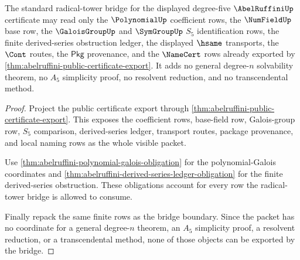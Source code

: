\begin{theorem}
\label{thm:abelruffini-standard-radical-tower-bridge-boundary}
The standard radical-tower bridge for the displayed degree-five
$\AbelRuffiniUp$ certificate may read only the $\PolynomialUp$ coefficient
rows, the $\NumFieldUp$ base row, the $\GaloisGroupUp$ and $\SymGroupUp$ $S_5$
identification rows, the finite derived-series obstruction ledger, the
displayed $\hsame$ transports, the $\Cont$ routes, the $\mathsf{Pkg}$
provenance, and the $\NameCert$ rows already exported by
\autoref{thm:abelruffini-public-certificate-export}. It adds no general
degree-$n$ solvability theorem, no $A_5$ simplicity proof, no resolvent
reduction, and no transcendental method.
\end{theorem}
\begin{proof}
Project the public certificate export through
\autoref{thm:abelruffini-public-certificate-export}. This exposes the
coefficient rows, base-field row, Galois-group row, $S_5$ comparison,
derived-series ledger, transport routes, package provenance, and local naming
rows as the whole visible packet.

Use \autoref{thm:abelruffini-polynomial-galois-obligation} for the
polynomial-Galois coordinates and
\autoref{thm:abelruffini-derived-series-ledger-obligation} for the finite
derived-series obstruction. These obligations account for every row the
radical-tower bridge is allowed to consume.

Finally repack the same finite rows as the bridge boundary. Since the packet
has no coordinate for a general degree-$n$ theorem, an $A_5$ simplicity proof,
a resolvent reduction, or a transcendental method, none of those objects can be
exported by the bridge.
\end{proof}

